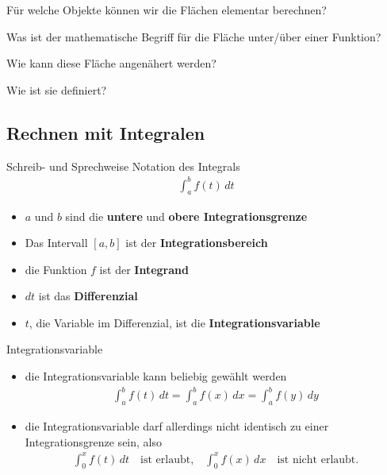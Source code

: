 \begin{Abschluss}
\item Für welche Objekte können wir die Flächen elementar berechnen?
\item Was ist der mathematische Begriff für die Fläche unter/über einer Funktion?
\item Wie kann diese Fläche angenähert werden?
\item Wie ist sie definiert?
\end{Abschluss}

\subsection{Rechnen mit Integralen}
\begin{frame}{Schreib- und Sprechweise}
Notation des Integrals
    \begin{gather*}
        \int_a^b f(t)\,dt
    \end{gather*}
    \begin{itemize}
        \item $a$ und $b$ sind die \textbf{untere} und \textbf{obere Integrationsgrenze}
        \item Das Intervall $[a,b]$ ist der \textbf{Integrationsbereich}
        \item die Funktion $f$ ist der \textbf{Integrand}
        \item $dt$ ist das \textbf{Differenzial}
        \item $t$, die Variable im Differenzial, ist die \textbf{Integrationsvariable}
    \end{itemize}
\end{frame}

\begin{frame}{Integrationsvariable}
    \begin{itemize}
        \item die Integrationsvariable kann beliebig gewählt werden
        \begin{gather*}
            \int_a^bf(t)\,dt = \int_a^b f(x)\,dx = \int_a^b f(y)\,dy
        \end{gather*}
        \item die Integrationsvariable darf allerdings nicht identisch zu einer Integrationsgrenze sein, also
        \begin{gather*}
            \int_0^x f(t)\,dt
            \quad\text{ist erlaubt,}\quad
            \int_0^x f(x)\,dx
            \quad\text{ist nicht erlaubt.}
        \end{gather*}
    \end{itemize}
\end{frame}

